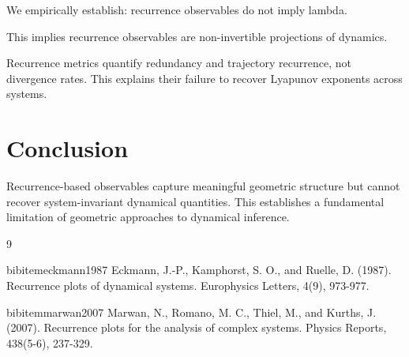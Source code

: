 \documentclass[11pt]{article}
\begin{document}
We empirically establish: recurrence observables do not imply lambda.

This implies recurrence observables are non-invertible projections of dynamics.

Recurrence metrics quantify redundancy and trajectory recurrence, not divergence rates. This explains their failure to recover Lyapunov exponents across systems.

\section{Conclusion}

Recurrence-based observables capture meaningful geometric structure but cannot recover system-invariant dynamical quantities. This establishes a fundamental limitation of geometric approaches to dynamical inference.

\begin{thebibliography}{9}

	bibitem{eckmann1987} Eckmann, J.-P., Kamphorst, S. O., and Ruelle, D. (1987). Recurrence plots of dynamical systems. Europhysics Letters, 4(9), 973-977.

	bibitem{marwan2007} Marwan, N., Romano, M. C., Thiel, M., and Kurths, J. (2007). Recurrence plots for the analysis of complex systems. Physics Reports, 438(5-6), 237-329.

\end{thebibliography}
\end{document}
